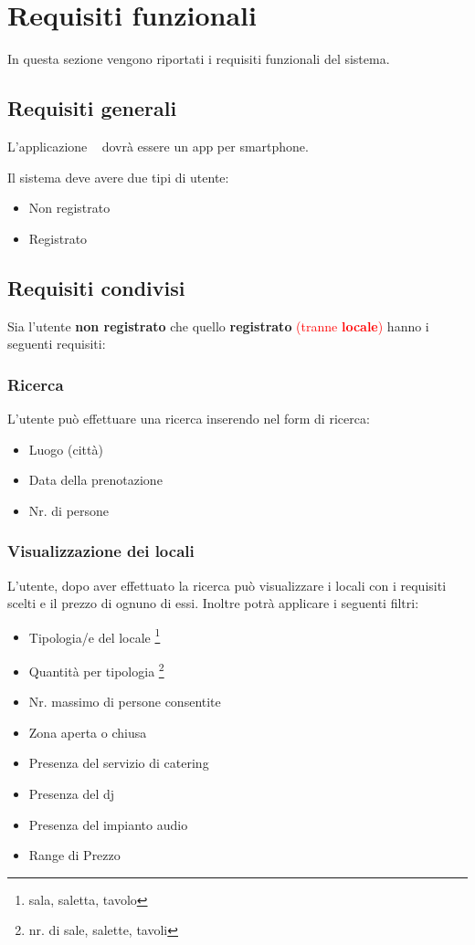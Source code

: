 \chapter{Requisiti funzionali}
In questa sezione vengono riportati i requisiti funzionali del sistema.

\section*{Requisiti generali}
L'applicazione \NameOfTheProject~ dovrà essere un app per smartphone.

\noindent Il sistema deve avere due tipi di utente:
\begin{itemize}
    \item Non registrato
    \item Registrato
\end{itemize}

\section{Requisiti condivisi}\label{sec:reqCondivisi}
Sia l'utente \textbf{non registrato} che quello \textbf{registrato} \textcolor{red}{(tranne \textbf{locale})} hanno i seguenti 
requisiti:

\subsection{Ricerca}\label{sec:ricerca}

L'utente può effettuare una ricerca inserendo nel form di ricerca:
\begin{itemize}
    \item Luogo (città)
    \item Data della prenotazione
    \item Nr. di persone
    \label{itm:ricerca}
\end{itemize}

\subsection{Visualizzazione dei locali} \label{sec:visLocali}
L'utente, dopo aver effettuato la ricerca può visualizzare i locali con i requisiti scelti e il prezzo di ognuno di
essi. Inoltre potrà applicare i seguenti filtri:
\begin{itemize}
    \item Tipologia/e del locale \footnote{sala, saletta, tavolo}
    \item Quantità per tipologia \footnote{nr. di sale, salette, tavoli}
    \item Nr. massimo di persone consentite
    \item Zona aperta o chiusa
    \item Presenza del servizio di catering
    \item Presenza del dj
    \item Presenza del impianto audio
    \item Range di Prezzo
    \label{itm:filtri}
\end{itemize}

